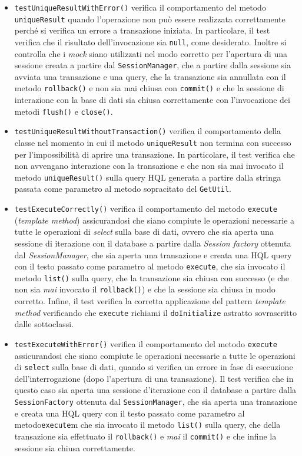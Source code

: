 \begin{itemize}
\begin{itemize}
\item \texttt{testUniqueResultWithError()} verifica il comportamento del metodo \texttt{uniqueResult} quando l'operazione non può essere realizzata correttamente perché si verifica un errore a transazione iniziata. In particolare, il test verifica che il risultato dell'invocazione sia \texttt{null}, come desiderato. Inoltre si controlla che i \textit{mock} siano utilizzati nel modo corretto per l'apertura di una sessione creata a partire dal \texttt{SessionManager}, che a partire dalla sessione sia avviata una transazione e una query, che la transazione sia annullata con il metodo \texttt{rollback()} e non sia mai chiusa con \texttt{commit()} e che la sessione di interazione con la base di dati sia chiusa correttamente con l'invocazione dei metodi \texttt{flush()} e \texttt{close()}.

\item \texttt{testUniqueResultWithoutTransaction()} verifica il comportamento della classe nel momento in cui il metodo \texttt{uniqueResult} non termina con successo per l'impossibilità di aprire una transazione. In particolare, il test verifica che non avvengano interazione con la transazione e che non sia mai invocato il metodo \texttt{uniqueResult()} sulla query HQL generata a partire dalla stringa passata come parametro al metodo sopracitato del \texttt{GetUtil}.

\item \texttt{testExecuteCorrectly()} verifica il comportamento del metodo \texttt{execute} (\textit{template method}) assicurandosi che siano compiute le operazioni necessarie a tutte le operazioni di \textit{select} sulla base di dati, ovvero che sia aperta una sessione di iterazione con il database a partire dalla \textit{Session factory} ottenuta dal \textit{SessionManager}, che sia aperta una transazione e creata una HQL query con il testo passato come parametro al metodo \texttt{execute}, che sia invocato il metodo \texttt{list()} sulla query, che la transazione sia chiusa con successo (e che non sia \textit{mai} invocato il \texttt{rollback()}) e che la sessione sia chiusa in modo corretto. Infine, il test verifica la corretta applicazione del pattern \textit{template method} verificando che \texttt{execute} richiami il \texttt{doInitialize} astratto sovrascritto dalle sottoclassi.

\item \texttt{testExecuteWithError()} verifica il comportamento del metodo \texttt{execute} assicurandosi che siano compiute le operazioni necessarie a tutte le operazioni di \texttt{select} sulla base di dati, quando si verifica un errore in fase di esecuzione dell'interrogazione (dopo l'apertura di una transazione). Il test verifica che in questo caso sia aperta una sessione d'iterazione con il database a partire dalla \texttt{SessionFactory} ottenuta dal \texttt{SessionManager}, che sia aperta una transazione e creata una HQL query con il testo passato come parametro al metodo\texttt{execute}m che sia invocato il metodo \texttt{list()} sulla query, che della transazione sia effettuato il \texttt{rollback()} e \textit{mai} il \texttt{commit()} e che infine la sessione sia chiusa correttamente.


\end{itemize}
\end{itemize}
